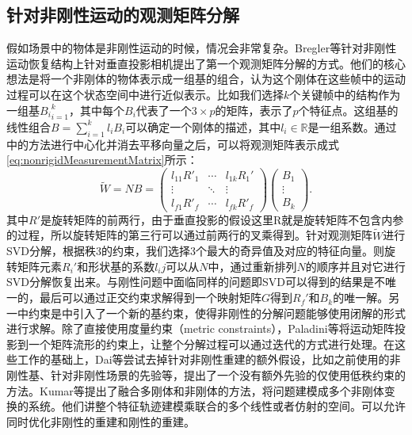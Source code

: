 \subsection{针对非刚性运动的观测矩阵分解}
假如场景中的物体是非刚性运动的时候，情况会非常复杂。Bregler\cite{Bregler2013Recovering}等针对非刚性运动恢复结构上针对垂直投影相机提出了第一个观测矩阵分解的方式。他们的核心想法是将一个非刚体的物体表示成一组基的组合，认为这个刚体在这些帧中的运动过程可以在这个状态空间中进行近似表示。比如我们选择$k$个关键帧中的结构作为一组基${B_i}_{i=1}^k$，其中每个$B_i$代表了一个$3\times p$的矩阵，表示了$p$个特征点。这组基的线性组合$B=\sum_{i=1}^k{l_i B_i}$可以确定一个刚体的描述，其中$l_i\in \mathbb{R}$是一组系数。通过\cite{Tomasi1992Shape}中的方法进行中心化并消去平移向量之后，可以将观测矩阵表示成式\eqref{eq:nonrigidMeasurementMatrix}所示：
\begin{equation}\label{eq:nonrigidMeasurementMatrix}
\tilde{W}=N B=
\begin{pmatrix}
l_{11}R'_1 &\cdots & l_{1k}R_1'\\
\vdots & \ddots & \vdots\\
l_{f1}R'_f & \cdots &l_{fk}R'_f
\end{pmatrix}
\begin{pmatrix}
B_1\\
\vdots\\
B_k
\end{pmatrix}.
\end{equation}
其中$R'$是旋转矩阵的前两行，由于垂直投影的假设这里R就是旋转矩阵不包含内参的过程，所以旋转矩阵的第三行可以通过前两行的叉乘得到。针对观测矩阵$\tilde{W}$进行SVD分解，根据秩3的约束，我们选择3个最大的奇异值及对应的特征向量。则旋转矩阵元素$R_i'$和形状基的系数$l_ij$可以从$N$中，通过重新排列$N$的顺序并且对它进行SVD分解恢复出来。与刚性问题中面临同样的问题即SVD可以得到的结果是不唯一的，最后可以通过正交约束求解得到一个映射矩阵$G$得到$R_f'$和$B_k$的唯一解。另一中约束是\cite{Xiao2006A}中引入了一个新的基约束，使得非刚性的分解问题能够使用闭解的形式进行求解。除了直接使用度量约束（metric constraints），Paladini等\cite{Paladini2009Factorization}将运动矩阵投影到一个矩阵流形的约束上，让整个分解过程可以通过迭代的方式进行处理。在这些工作的基础上，Dai等\cite{Dai2012A}尝试去掉针对非刚性重建的额外假设，比如之前使用的非刚性基、针对非刚性场景的先验等，提出了一个没有额外先验的仅使用低秩约束的方法。Kumar等\cite{Kumar2016Multi}提出了融合多刚体和非刚体的方法，将问题建模成多个非刚体变换的系统。他们讲整个特征轨迹建模乘联合的多个线性或者仿射的空间。可以允许同时优化非刚性的重建和刚性的重建。

